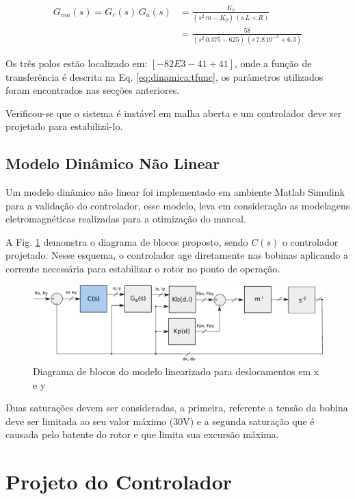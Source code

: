 \begin{align}
	G_{ma}(s) = G_r(s) \, G_a(s) &= \frac{K_b}{(s^2 \, m - K_p) \, (s\, L + R)}	\label{eq:dinamica:tfunc:gen} \\
	&= \frac{58}{(s^2 \, 0.375 - 625) \, (s\, 7.8 \, 10^{-5} + 6.3)}
	 \label{eq:dinamica:tfunc}
\end{align}
 

Os três polos estão localizado em: $[-82E3 -41 +41]	$, onde a função de transferência é descrita na Eq. \eqref{eq:dinamica:tfunc}, os parâmetros utilizados foram encontrados nas secções anteriores. 

Verificou-se que o sistema é instável em malha aberta e um controlador deve ser projetado para estabilizá-lo. 

\subsection{Modelo Dinâmico Não Linear}

Um modelo dinâmico não linear foi implementado em ambiente Matlab Simulink para a validação do controlador, esse modelo, leva em consideração as modelagens eletromagnéticas realizadas para a otimização do mancal.

A Fig. \ref{fig:diagrama:blocos:modelo:linear} demonstra o diagrama de blocos proposto, sendo $C(s)$ o controlador projetado. Nesse esquema, o controlador age diretamente nas bobinas aplicando a corrente necessária para estabilizar o rotor no ponto de operação. 

\begin{figure}[th!]
	\centering
	\includegraphics[width=1\linewidth]{../Figs/Modelagem/diagrama_blocos_modelo_linear}
	\caption{Diagrama de blocos do modelo linearizado para deslocamentos em x e y}
	\label{fig:diagrama:blocos:modelo:linear}
\end{figure}

Duas saturações devem ser consideradas, a primeira, referente a tensão da bobina deve ser limitada ao seu valor máximo (30V) e a segunda saturação que é causada pelo batente do rotor e que limita sua excursão máxima.

\section{Projeto do Controlador}

